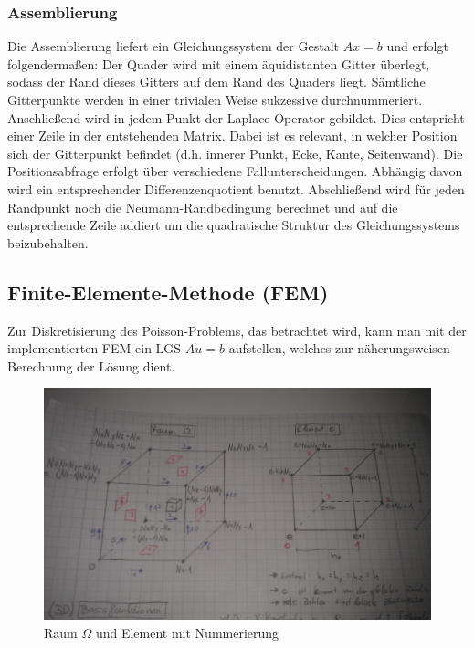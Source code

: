 \subsubsection{Assemblierung}
Die Assemblierung liefert ein Gleichungssystem der Gestalt $Ax=b$ und erfolgt folgendermaßen:
Der Quader wird mit einem äquidistanten Gitter überlegt, sodass der Rand dieses Gitters auf dem Rand des Quaders liegt.
Sämtliche Gitterpunkte werden in einer trivialen Weise sukzessive durchnummeriert.
Anschließend wird in jedem Punkt der Laplace-Operator gebildet. Dies entspricht einer Zeile in der entstehenden Matrix. Dabei ist es relevant, in welcher Position sich der Gitterpunkt befindet (d.h. innerer Punkt, Ecke, Kante, Seitenwand).
Die Positionsabfrage erfolgt über verschiedene Fallunterscheidungen. Abhängig davon wird
ein entsprechender Differenzenquotient benutzt.
Abschließend wird für jeden Randpunkt noch die Neumann-Randbedingung berechnet und auf die entsprechende Zeile addiert um die quadratische Struktur des Gleichungssystems beizubehalten.

 
\subsection{Finite-Elemente-Methode (FEM)}
Zur Diskretisierung des Poisson-Problems, das betrachtet wird, kann man mit der implementierten FEM ein LGS $A u = b$ aufstellen, welches zur näherungsweisen Berechnung der Lösung dient. \\

\begin{figure}[h]
	\begin{center}
		\includegraphics[scale=0.15]{./Bilder/draft}
		
		\caption{Raum $\Omega$ und Element mit Nummerierung}\label{draft}
	\end{center}
\end{figure}

